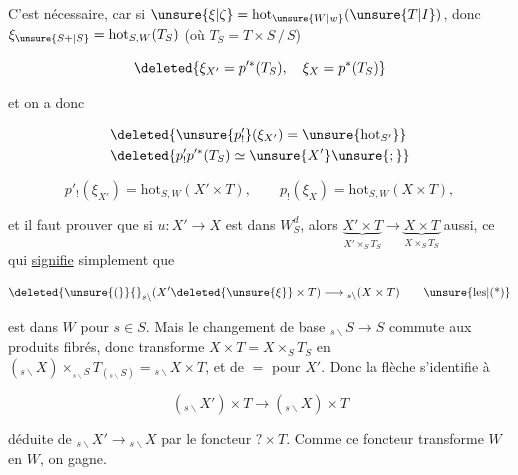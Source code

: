 
C'est nécessaire, car  si $\unsure{\xi|\zeta}=\mathrm{hot}_{\unsure{W|w}}(\unsure{T|I})$,  donc $\xi_{\unsure{S+|S}}=\mathrm{hot}_{S,W}(T_S)$ (où $T_S=T\times S\,/\,S$)


\[
 \deleted{\xi_{X'}=p'^*(T_S),\quad \xi_X=p^*(T_S)}
\]

et on a donc

\[
\begin{aligned}
 &\deleted{\unsure{p'_!}(\xi_{X'})=\unsure{\mathrm{hot}_{S'}}}\\
 &\deleted{p'_!p'^*(T_S)\simeq\unsure{X'}\unsure{;}}
\end{aligned}
\]

\[
 p'_!(\xi_{X'})=\mathrm{hot}_{S,W}(X'\times T),\qquad
 p_!(\xi_X)=\mathrm{hot}_{S,W}(X\times T),
\]

et il faut prouver que si $u:X'\longrightarrow X$ est dans $W_S^d$, alors $\underbrace{X'\times T}_{X'\times_S T_S}\longrightarrow\underbrace{X\times T}_{X\times_S T_S}$ aussi, ce qui \uline{signifie} simplement que 

\[
 \deleted{\unsure{(}}{}_{s\backslash}(X'\deleted{\unsure{\xi}}\times T)\longrightarrow{}_{s\backslash}(X\times T)\tag*{\unsure{les|(*)}}
\]

est dans $W$ pour  $s\in S$. Mais le changement de base $ {}_{s\backslash}S\longrightarrow S$ commute aux produits fibrés, donc transforme $X\times T=X\times_S T_S$ en $({}_{s\backslash}X)\times_{{}_{s\backslash}S}T_{({}_{s\backslash}S)}={}_{s\backslash}X\times T$, et de $=$ pour $X'$. Donc la flèche s'identifie à

\[
 ({}_{s\backslash}X')\times T\longrightarrow({}_{s\backslash}X)\times T
\]

déduite de $ {}_{s\backslash}X'\longrightarrow{}_{s\backslash}X$ par  le foncteur $?\times T$. Comme ce foncteur transforme $W$ en $W$, on gagne. 

